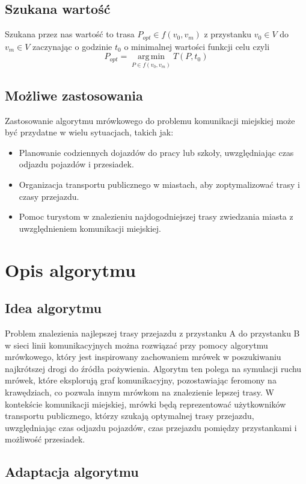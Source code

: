 \documentclass{article}
\begin{document}
\subsection{Szukana wartość}
Szukana przez nas wartość to trasa \(P_{opt}\in f(v_0, v_m)\) z przystanku \(v_0\in V\) do \(v_m\in V\) zaczynając o godzinie \(t_0\)
o minimalnej wartości funkcji celu czyli
\[P_{opt} = \operatorname*{\arg\,\min}_{P\in f(v_0, v_m)} T(P, t_0)\]

\subsection{Możliwe zastosowania}
Zastosowanie algorytmu mrówkowego do problemu komunikacji miejskiej może być przydatne w wielu sytuacjach, takich jak:
\begin{itemize}
    \item Planowanie codziennych dojazdów do pracy lub szkoły, uwzględniając czas odjazdu pojazdów i przesiadek.
    \item Organizacja transportu publicznego w miastach, aby zoptymalizować trasy i czasy przejazdu.
    \item Pomoc turystom w znalezieniu najdogodniejszej trasy zwiedzania miasta z uwzględnieniem komunikacji miejskiej.
\end{itemize}

\section{Opis algorytmu}

\subsection{Idea algorytmu}
Problem znalezienia najlepszej trasy przejazdu z przystanku A do przystanku B w sieci linii komunikacyjnych można rozwiązać
przy pomocy algorytmu mrówkowego, który jest inspirowany zachowaniem mrówek w poszukiwaniu najkrótszej drogi do źródła pożywienia.
Algorytm ten polega na symulacji ruchu mrówek, które eksplorują graf komunikacyjny, pozostawiając feromony na krawędziach,
co pozwala innym mrówkom na znalezienie lepszej trasy. W kontekście komunikacji miejskiej, mrówki będą reprezentować
użytkowników transportu publicznego, którzy szukają optymalnej trasy przejazdu, uwzględniając czas odjazdu pojazdów,
czas przejazdu pomiędzy przystankami i możliwość przesiadek.

\subsection{Adaptacja algorytmu}
\end{document}
